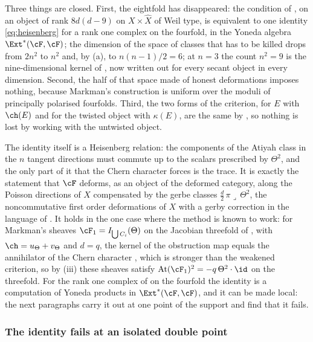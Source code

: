 \begin{remark}\label{rem:factorclosed}
Three things are closed. First, the eightfold has disappeared: the condition
of , on an object of rank $8d(d-9)$ on $X\times\widehat X$
of Weil type, is equivalent to one identity \eqref{eq:heisenberg} for a rank
one complex on the fourfold, in the Yoneda algebra $\Ext^{*}(\cF,\cF)$; the
dimension of the space of classes that has to be killed drops from $2n^{2}$
to $n^{2}$ and, by (a), to $n(n-1)/2=6$; at $n=3$ the count $n^{2}=9$ is the
nine-dimensional kernel of \cite[Corollaries 8.3.12 and 8.5.2]{Mar25a}, now
written out for every secant object in every dimension. Second, the half of that space made
of honest deformations imposes nothing, because Markman's construction is
uniform over the moduli of principally polarised fourfolds. Third, the two
forms of the criterion, for $E$ with $\ch(E)$ and for the twisted object with
$\kappa(E)$, are the same by , so nothing is lost by working
with the untwisted object.

The identity itself is a Heisenberg relation: the components of the Atiyah
class in the $n$ tangent directions must commute up to the scalars
prescribed by $\Theta^{2}$, and the only part of it that the Chern character
forces is the trace. It is exactly the statement that $\cF$ deforms, as an
object of the deformed category, along the Poisson directions of $X$
compensated by the gerbe classes $\tfrac d2\,\pi\lrcorner\,\Theta^{2}$, the
noncommutative first order deformations of $X$ with a gerby correction in
the language of \cite[Section 8.5]{Mar25a}. It holds
in the one case where the method is known to work: for Markman's sheaves
$\cF_{1}=I_{\bigcup C_{i}}(\Theta)$ on the Jacobian threefold of
\cite[Section 11.1]{Mar25b}, with $\ch=u_{\Theta}+v_{\Theta}$ and $d=q$, the
kernel of the obstruction map equals the annihilator of the Chern character
\cite[Corollary 8.3.12]{Mar25a}, which is stronger than the weakened
criterion, so by (iii) these sheaves satisfy
$\mathrm{At}(\cF_{1})^{2}=-q\,\Theta^{2}\cdot\id$ on the threefold. For
the rank one complex of  on the fourfold the identity
is a computation of Yoneda products in $\Ext^{*}(\cF,\cF)$, and it can be
made local: the next paragraphs carry it out at one point of the support and
find that it fails.
\end{remark}

\subsubsection*{The identity fails at an isolated double point}

